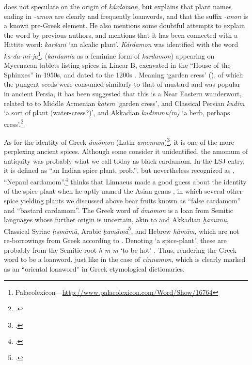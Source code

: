 \textcite[644]{beekes_etymological_2010} does not speculate on the origin of \textit{kárdamon}, but explains that plant names ending in \textit{-amon} are clearly and frequently loanwords, and that the suffix \textit{-anon} is a known pre-Greek element. He also mentions some doubtful attempts to explain the word by previous authors, and mentions that it has been connected with a Hittite word: \textit{karšani} `an alcalic plant'. \textit{Kárdamon} was identified with the word \lb{\KADAMIJA} \textit{ka-da-mi-ja}\footnote{Palaeolexicon---\url{http://www.palaeolexicon.com/Word/Show/16764}}, (\textit{kardamia} as a feminine form of \textit{kardamon}) appearing on Mycenaean tablets listing spices in Linear B, excavated in the ``House of the Sphinxes'' in 1950s, and dated to the 1200s \BC{} \autocite[107]{bennett_mycenae_1958}. Meaning `garden cress' (), of which the pungent seeds were consumed similarly to that of mustard and was popular in ancient Persia, it has been suggested that this is a Near Eastern \gls{wanderwort}, related to to Middle Armenian  \textit{kotem} `garden cress', and Classical Persian  \textit{kūdim} `a sort of plant (water-cress?)', and Akkadian \textit{kudimmu(m)} `a herb, perhaps cress'.\footcites[cf.][p. 371 ]{kouyoumdjian_comprehensive_1970}[]{asatrian_marginal_2012}[L14]{black_concise_2000}



As for the identity of Greek \textit{ámōmon} (Latin \textit{amomum})\footcite[amomum]{lewis_latin_1879}, it is one of the more perplexing ancient spices. Although some consider it unidentified, the amomum of antiquity was probably what we call today as black cardamom. In the \gls{LSJ} entry, it is defined as ``an Indian spice plant, prob.'', but nevertheless recognized as , ``Nepaul cardamom''.\footcite[ἄμωμον]{liddell_greek-english_1940} \textcite[103]{dalby_dangerous_2000} thinks that Linnaeus made a good guess about the identity of the spice plant when he aptly named the Asian genus , in which several other spice yielding plants we discussed above bear fruits known as ``false cardamom'' and ``bastard cardamom''. The Greek word of \textit{ámōmon} is a loan from Semitic languages whose further origin is uncertain, akin to and Akkadian \textit{ḫamīmu}, Classical Syriac  \textit{ḥəmāmā}, Arabic  \textit{ḥamāmā}\footcites[cf.][vol. 6, p. 66]{roth_assyrian_2004} [cardamom ]{ahd}[169]{low_aramaeische_1881}[100]{lev_practical_2008}, and Hebrew  
\textit{hămām}, which are not re-borrowings from Greek according to \textcite[123]{low_aramaeische_1881}. Denoting `a spice-plant', these are probably from the Semitic root \textit{h-m-m} `to be hot' \parencite[222]{klein_comprehensive_1987}. Thus, rendering the Greek word to be a loanword, just like in the case of \textit{cinnamon}, which is clearly marked as an ``oriental loanword'' in Greek etymological dictionaries.

